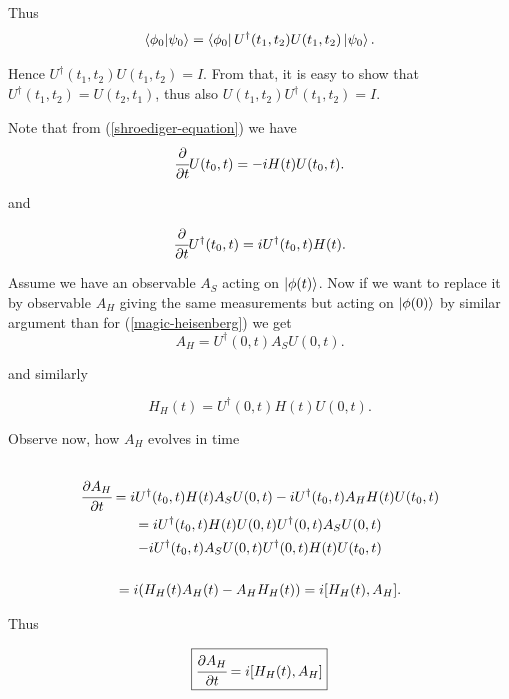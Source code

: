 \documentclass[main.tex]{subfiles}
\begin{document}
Thus
\begin{equation}
\bra{\phi_0}\ket{\psi_0} = \bra{\phi_0}U^\dag(t_1, t_2) U(t_1, t_2) \ket{\psi_0}.
\end{equation} 

Hence $U^\dag(t_1, t_2) U(t_1, t_2) = I$. From that, it is easy to show that $U^\dag(t_1, t_2) = U(t_2, t_1)$, thus also $U(t_1, t_2) U^\dag(t_1, t_2) = I$.

Note that from (\ref{shroediger-equation}) we have
\begin{equation}
\cfrac{\partial}{\partial t} U(t_0, t) = -i H(t) U(t_0, t).
\end{equation}

and

\begin{equation}
\cfrac{\partial}{\partial t} U^\dag(t_0, t) = i U^\dag(t_0, t) H(t).
\end{equation}


Assume we have an observable $A_S$ acting on $\ket{\phi(t)}$. Now if we want to replace it by observable $A_H$ giving the same measurements but acting on $\ket{\phi(0)}$ by similar argument than for (\ref{magic-heisenberg}) we get
\begin{equation}
A_H = U^\dag(0, t) A_S U(0, t).
\end{equation}

and similarly

\begin{equation}
\label{ha-ha}
H_H(t) = U^\dag(0, t) H(t) U(0, t).
\end{equation}


Observe now, how $A_H$ evolves in time
\begin{multline*}\\
\cfrac{\partial A_H}{\partial t} = i U^\dag(t_0, t) H(t) A_S U(0, t) - i  U^\dag(t_0, t) A_H H(t) U(t_0, t)\\
= i U^\dag(t_0, t) H(t) U(0, t) U^\dag(0, t) A_S U(0, t) 
\\- i  U^\dag(t_0, t) A_S  U(0, t) U^\dag(0, t) H(t) U(t_0, t)\\
\\ = i (H_H(t)A_H(t)  - A_H H_H(t)) = i [H_H(t), A_H].
\\
\end{multline*}

Thus

\begin{equation}
\label{time-dependent-heisenberg}
\boxed{
\cfrac{\partial A_H}{\partial t} = i [H_H(t), A_H]
}
\end{equation}
\end{document}
